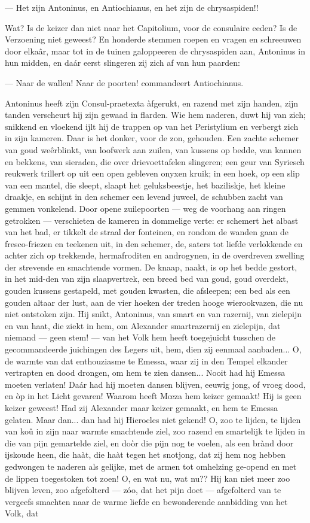 \documentclass[a4paper, 12pt, oneside, dutch]{article}
\begin{document}
--- Het zijn Antoninus, en Antiochianus, en het zijn de chrysaspiden!!

Wat? Is de keizer dan niet naar het Capitolium, voor de consulaire eeden? Is de Verzoening niet geweest? En honderde stemmen roepen en vragen en schreeuwen door elkaâr, maar tot in de tuinen galoppeeren de chrysaspiden aan, Antoninus in hun midden, en daár eerst slingeren zij zich af van hun paarden:

--- Naar de wallen! Naar de poorten! commandeert Antiochianus.

Antoninus heeft zijn Consul-praetexta àfgerukt, en razend met zijn handen, zijn tanden verscheurt hij zijn gewaad in flarden. Wie hem naderen, duwt hij van zich; snikkend en vloekend ijlt hij de trappen op van het Peristylium en verbergt zich in zijn kameren. Daar is het donker, voor de zon, gehouden. Een zachte schemer van goud weêrblinkt, van loofwerk aan zuilen, van kussens op bedde, van kannen en bekkens, van sieraden, die over drievoettafelen slingeren; een geur van Syriesch reukwerk trillert op uit een open gebleven onyxen kruik; in een hoek, op een slip van een mantel, die sleept, slaapt het geluksbeestje, het baziliskje, het kleine draakje, en schijnt in den schemer een levend juweel, de schubben zacht van gemmen vonkelend. Door opene zuilepoorten --- weg de voorhang aan ringen getrokken --- verschieten de kameren in dommelige verte: er schemert het albast van het bad, er tikkelt de straal der fonteinen, en rondom de wanden gaan de fresco-friezen en teekenen uit, in den schemer, de, saters tot liefde verlokkende en achter zich op trekkende, hermafroditen en androgynen, in de overdreven zwelling der strevende en smachtende vormen. De knaap, naakt, is op het bedde gestort, in het mid-den van zijn slaapvertrek, een breed bed van goud, goud overdekt, gouden kussens gestapeld, met gouden kwasten, die afsleepen; een bed als een gouden altaar der lust, aan de vier hoeken der treden hooge wierookvazen, die nu niet ontstoken zijn. Hij snikt, Antoninus, van smart en van razernij, van zielepijn en van haat, die ziekt in hem, om Alexander smartrazernij en zielepijn, dat niemand --- geen stem! --- van het Volk hem heeft toegejuicht tusschen de gecommandeerde juichingen des Legers uit, hem, dien zij eenmaal aanbaden... O, de warmte van dat enthouziasme te Emessa, waar zij in den Tempel elkander vertrapten en dood drongen, om hem te zien dansen... Nooit had hij Emessa moeten verlaten! Daár had hij moeten dansen blijven, eeuwig jong, of vroeg dood, en òp in het Licht gevaren! Waarom heeft Mœza hem keizer gemaakt! Hij is geen keizer geweest! Had zij Alexander maar keizer gemaakt, en hem te Emessa gelaten. Maar dan... dan had hij Hierocles niet gekend! O, zoo te lijden, te lijden van koû in zijn naar warmte smachtende ziel, zoo razend en smartelijk te lijden in die van pijn gemartelde ziel, en doòr die pijn nog te voelen, als een brànd door ijskoude heen, die haàt, die haàt tegen het snotjong, dat zij hem nog hebben gedwongen te naderen als gelijke, met de armen tot omhelzing ge-opend en met de lippen toegestoken tot zoen! O, en wat nu, wat nu?? Hij kan niet meer zoo blijven leven, zoo afgefolterd --- zóo, dat het pijn doet --- afgefolterd van te vergeefs smachten naar de warme liefde en bewonderende aanbidding van het Volk, dat 
\end{document}
